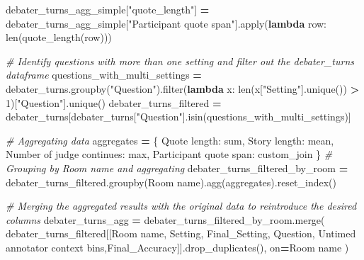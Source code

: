 \documentclass[
]{article}
\newenvironment{Shaded}{\begin{snugshade}}{\end{snugshade}}
\newcommand{\BuiltInTok}[1]{#1}
\newcommand{\CommentTok}[1]{\textcolor[rgb]{0.56,0.35,0.01}{\textit{#1}}}
\newcommand{\DecValTok}[1]{\textcolor[rgb]{0.00,0.00,0.81}{#1}}
\newcommand{\KeywordTok}[1]{\textcolor[rgb]{0.13,0.29,0.53}{\textbf{#1}}}
\newcommand{\NormalTok}[1]{#1}
\newcommand{\OperatorTok}[1]{\textcolor[rgb]{0.81,0.36,0.00}{\textbf{#1}}}
\newcommand{\StringTok}[1]{\textcolor[rgb]{0.31,0.60,0.02}{#1}}
\begin{document}
\begin{Shaded}
\begin{Highlighting}[]
\NormalTok{debater\_turns\_agg\_simple[}\StringTok{"quote\_length"}\NormalTok{] }\OperatorTok{=}\NormalTok{ debater\_turns\_agg\_simple[}\StringTok{"Participant quote span"}\NormalTok{].}\BuiltInTok{apply}\NormalTok{(}\KeywordTok{lambda}\NormalTok{ row: }\BuiltInTok{len}\NormalTok{(quote\_length(row)))}




\CommentTok{\# Identify questions with more than one setting and filter out the debater\_turns dataframe}
\NormalTok{questions\_with\_multi\_settings }\OperatorTok{=}\NormalTok{ debater\_turns.groupby(}\StringTok{"Question"}\NormalTok{).}\BuiltInTok{filter}\NormalTok{(}\KeywordTok{lambda}\NormalTok{ x: }\BuiltInTok{len}\NormalTok{(x[}\StringTok{"Setting"}\NormalTok{].unique()) }\OperatorTok{\textgreater{}} \DecValTok{1}\NormalTok{)[}\StringTok{"Question"}\NormalTok{].unique()}
\NormalTok{debater\_turns\_filtered }\OperatorTok{=}\NormalTok{ debater\_turns[debater\_turns[}\StringTok{"Question"}\NormalTok{].isin(questions\_with\_multi\_settings)]}

\CommentTok{\# Aggregating data}
\NormalTok{aggregates }\OperatorTok{=}\NormalTok{ \{}
    \StringTok{\textquotesingle{}Quote length\textquotesingle{}}\NormalTok{: }\StringTok{\textquotesingle{}sum\textquotesingle{}}\NormalTok{,}
    \StringTok{\textquotesingle{}Story length\textquotesingle{}}\NormalTok{: }\StringTok{\textquotesingle{}mean\textquotesingle{}}\NormalTok{,}
    \StringTok{\textquotesingle{}Number of judge continues\textquotesingle{}}\NormalTok{: }\StringTok{\textquotesingle{}max\textquotesingle{}}\NormalTok{,}
    \StringTok{\textquotesingle{}Participant quote span\textquotesingle{}}\NormalTok{: custom\_join}
\NormalTok{\}}
\CommentTok{\# Grouping by \textquotesingle{}Room name\textquotesingle{} and aggregating}
\NormalTok{debater\_turns\_filtered\_by\_room }\OperatorTok{=}\NormalTok{ debater\_turns\_filtered.groupby(}\StringTok{\textquotesingle{}Room name\textquotesingle{}}\NormalTok{).agg(aggregates).reset\_index()}

\CommentTok{\# Merging the aggregated results with the original data to reintroduce the desired columns}
\NormalTok{debater\_turns\_agg }\OperatorTok{=}\NormalTok{ debater\_turns\_filtered\_by\_room.merge(}
\NormalTok{    debater\_turns\_filtered[[}\StringTok{\textquotesingle{}Room name\textquotesingle{}}\NormalTok{, }\StringTok{\textquotesingle{}Setting\textquotesingle{}}\NormalTok{, }\StringTok{\textquotesingle{}Final\_Setting\textquotesingle{}}\NormalTok{, }\StringTok{\textquotesingle{}Question\textquotesingle{}}\NormalTok{, }\StringTok{\textquotesingle{}Untimed annotator context bins\textquotesingle{}}\NormalTok{,}\StringTok{\textquotesingle{}Final\_Accuracy\textquotesingle{}}\NormalTok{]].drop\_duplicates(),}
\NormalTok{    on}\OperatorTok{=}\StringTok{\textquotesingle{}Room name\textquotesingle{}}
\NormalTok{)}


\end{Highlighting}
\end{Shaded}
\end{document}

